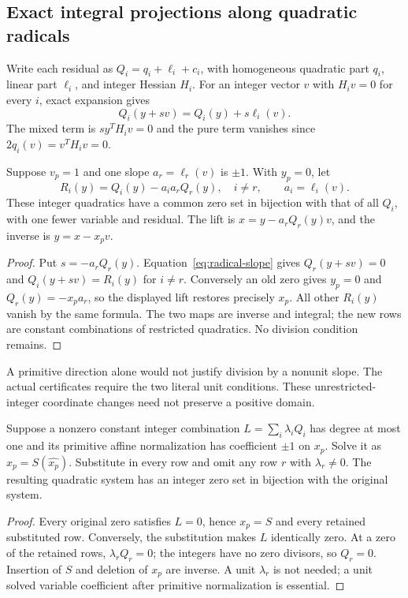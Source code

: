 \subsection{Exact integral projections along quadratic radicals}
Write each residual as $Q_i=q_i+\ell_i+c_i$, with homogeneous quadratic
part $q_i$, linear part $\ell_i$, and integer Hessian $H_i$.
For an integer vector $v$ with $H_iv=0$ for every $i$, exact expansion gives
\begin{equation}\label{eq:radical-slope}
 Q_i(y+sv)=Q_i(y)+s\ell_i(v).
\end{equation}
The mixed term is $sy^TH_iv=0$ and the pure term vanishes since
$2q_i(v)=v^TH_iv=0$.

\begin{theorem}\label{thm:radical-projection}
Suppose $v_p=1$ and one slope $a_r=\ell_r(v)$ is $\pm1$.
With $y_p=0$, let
\[
 R_i(y)=Q_i(y)-a_ia_rQ_r(y),\quad i\ne r,
 \qquad a_i=\ell_i(v).
\]
These integer quadratics have a common zero set in bijection with that
of all $Q_i$, with one fewer variable and residual. The lift is
$x=y-a_rQ_r(y)v$, and the inverse is $y=x-x_pv$.
\end{theorem}
\begin{proof}
Put $s=-a_rQ_r(y)$. Equation~\eqref{eq:radical-slope} gives
$Q_r(y+sv)=0$ and $Q_i(y+sv)=R_i(y)$ for $i\ne r$.
Conversely an old zero gives $y_p=0$ and
$Q_r(y)=-x_pa_r$, so the displayed lift restores precisely $x_p$.
All other $R_i(y)$ vanish by the same formula. The two maps are inverse
and integral; the new rows are constant combinations of restricted
quadratics. No division condition remains.
\end{proof}
A primitive direction alone would not justify division by a nonunit
slope. The actual certificates require the two literal unit conditions.
These unrestricted-integer coordinate changes need not preserve a
positive domain.

\begin{lemma}\label{lem:affine-elimination}
Suppose a nonzero constant integer combination $L=\sum_i\lambda_iQ_i$
has degree at most one and its primitive affine normalization has
coefficient $\pm1$ on $x_p$. Solve it as $x_p=S(\widehat{x_p})$.
Substitute in every row and omit any row $r$ with $\lambda_r\ne0$.
The resulting quadratic system has an integer zero set in bijection
with the original system.
\end{lemma}
\begin{proof}
Every original zero satisfies $L=0$, hence $x_p=S$ and every retained
substituted row. Conversely, the substitution makes $L$ identically
zero. At a zero of the retained rows, $\lambda_rQ_r=0$; the integers
have no zero divisors, so $Q_r=0$. Insertion of $S$ and deletion of
$x_p$ are inverse. A unit $\lambda_r$ is not needed; a unit solved
variable coefficient after primitive normalization is essential.
\end{proof}

